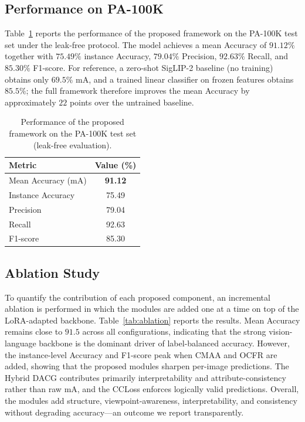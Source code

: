 \documentclass{ieeeaccess}
\begin{document}
\subsection{Performance on PA-100K}
Table~\ref{tab:main_results} reports the performance of the proposed framework on the PA-100K test set
under the leak-free protocol. The model achieves a mean Accuracy of $\mathbf{91.12\%}$ together with
$75.49\%$ instance Accuracy, $79.04\%$ Precision, $92.63\%$ Recall, and $85.30\%$ F1-score. For
reference, a zero-shot SigLIP-2 baseline (no training) obtains only $69.5\%$ mA, and a trained linear
classifier on frozen features obtains $85.5\%$; the full framework therefore improves the mean
Accuracy by approximately $22$ points over the untrained baseline.

\begin{table}[htbp]
\centering
\caption{Performance of the proposed framework on the PA-100K test set (leak-free evaluation).}
\label{tab:main_results}
\begin{tabular}{|l|c|}
\hline
\rowcolor{blue!15}
\textbf{Metric} & \textbf{Value (\%)} \\ \hline
Mean Accuracy (mA) & \textbf{91.12} \\ \hline
Instance Accuracy  & 75.49 \\ \hline
Precision          & 79.04 \\ \hline
Recall             & 92.63 \\ \hline
F1-score           & 85.30 \\ \hline
\end{tabular}
\end{table}

\subsection{Ablation Study}
To quantify the contribution of each proposed component, an incremental ablation is performed in which
the modules are added one at a time on top of the LoRA-adapted backbone. Table~\ref{tab:ablation}
reports the results. Mean Accuracy remains close to $91.5$ across all configurations, indicating that
the strong vision-language backbone is the dominant driver of label-balanced accuracy. However, the
instance-level Accuracy and F1-score peak when CMAA and OCFR are added, showing that the proposed
modules sharpen per-image predictions. The Hybrid DACG contributes primarily interpretability and
attribute-consistency rather than raw mA, and the CCLoss enforces logically valid predictions. Overall,
the modules add structure, viewpoint-awareness, interpretability, and consistency without degrading
accuracy---an outcome we report transparently.
\end{document}
